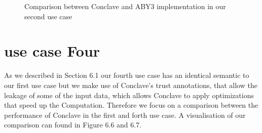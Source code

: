 \begin{figure}
	\caption{Comparison between Conclave and ABY3 implementation in our second use case}
\end{figure}



\section{use case Four}
As we described in Section 6.1 our fourth use case has an identical semantic to our first use case but we make use of Conclave's trust annotations, that allow the leakage of some of the input data, which allows Conclave to apply optimizations that speed up the Computation. Therefore we focus on a comparison between the performance of Conclave in the first and forth use case. A visualisation of  our comparison can found in Figure 6.6 and 6.7. 
